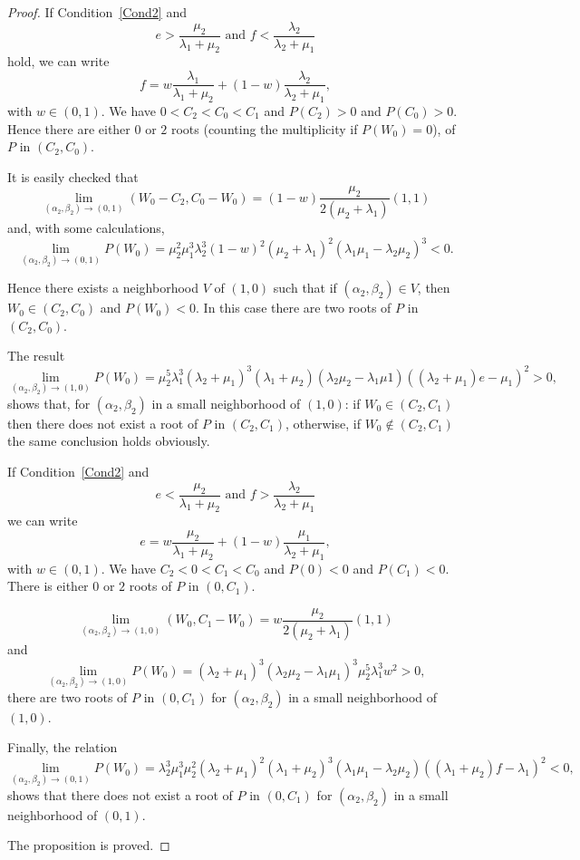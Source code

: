 \documentclass[10pt,a4paper]{amsart}
\begin{document}
\begin{proof}
If Condition~\eqref{Cond2} and
\[
e>\frac{\mu_2}{\lambda_1{+}\mu_2} \text{ and } f< \frac{\lambda_2}{\lambda_2{+}\mu_1}
\]
hold, we can write
\[
f=w\frac{\lambda_1}{\lambda_1+\mu_2} +(1-w)\frac{\lambda_2}{\lambda_2{+}\mu_1},
\]
with $w{\in}(0,1)$. We have $0{<}C_2{<}C_0{<}C_1$ and $P(C_2){>}0$ and $P(C_0){>}0$. Hence there are either $0$ or $2$ roots (counting the multiplicity if $P(W_0){=}0$), of $P$ in $(C_2,C_0)$. 

It is easily checked that 
\[
\lim_{(\alpha_2,\beta_2)\to(0,1)} (W_0{-}C_2,C_0{-}W_0)=(1{-}w)\frac{\mu_2}{2(\mu_2{+}\lambda_1)}(1,1)
\]
and, with some calculations, 
\[
\lim_{(\alpha_2,\beta_2)\to(0,1)} P(W_0)=\mu_2^2\mu_1^3\lambda_2^3(1{-}w)^2(\mu_2{+}\lambda_1)^2(\lambda_1\mu_1{-}\lambda_2\mu_2)^3 <0. 
\]

Hence there exists a neighborhood $V$ of $(1,0)$ such that if $(\alpha_2,\beta_2){\in}V$, then $W_0{\in}(C_2,C_0)$ and $P(W_0)<0$. In this case there are two roots of $P$ in $(C_2,C_0)$.

The result
\[
\lim_{(\alpha_2,\beta_2)\to(1,0)} P(W_0)=\mu_2^5\lambda_1^3(\lambda_2{+}\mu_1)^3(\lambda_1{+}\mu_2)(\lambda_2\mu_2{-}\lambda_1\mu1)((\lambda_2{+}\mu_1)e{-}\mu_1)^2>0,
\]
shows that, for $(\alpha_2,\beta_2)$ in a small neighborhood of $(1,0)$: if $W_0{\in}(C_2,C_1)$ then there does not exist a root of $P$ in $(C_2,C_1)$, otherwise, if $W_0{\not\in}(C_2,C_1)$ the same conclusion holds obviously.

If Condition~\eqref{Cond2} and
\[
e<\frac{\mu_2}{\lambda_1{+}\mu_2} \text{ and } f>\frac{\lambda_2}{\lambda_2{+}\mu_1}
\]
we can write
\[
e=w\frac{\mu_2}{\lambda_1+\mu_2} +(1-w)\frac{\mu_1}{\lambda_2{+}\mu_1},
\]
with $w{\in}(0,1)$. We have $C_2{<}0{<}C_1{<}C_0$ and $P(0){<}0$ and $P(C_1){<}0$. There is either $0$ or $2$ roots of $P$ in $(0,C_1)$. 

\[
\lim_{(\alpha_2,\beta_2)\to(1,0)} (W_0,C_1{-}W_0)=w\frac{\mu_2}{2(\mu_2{+}\lambda_1)}(1,1)
\]
and
\[
\lim_{(\alpha_2,\beta_2)\to(1,0)} P(W_0)=(\lambda_2{+}\mu_1)^3(\lambda_2\mu_2{-}\lambda_1\mu_1)^3\mu_2^5\lambda_1^3w^2>0,
\]
there are two roots of $P$ in $(0,C_1)$ for $(\alpha_2,\beta_2)$ in a small neighborhood of $(1,0)$.

Finally, the relation
\[
\lim_{(\alpha_2,\beta_2)\to(0,1)} P(W_0)=\lambda_2^3\mu_1^3\mu_2^2(\lambda_2{+}\mu_1)^2(\lambda_1{+}\mu_2)^3(\lambda_1\mu_1{-}\lambda_2\mu_2)((\lambda_1{+}\mu_2)f{-}\lambda_1)^2<0,
\]
shows that there does not exist a root of $P$ in $(0,C_1)$ for $(\alpha_2,\beta_2)$ in a small neighborhood of $(0,1)$.

The proposition is proved.
\end{proof}
\end{document}
